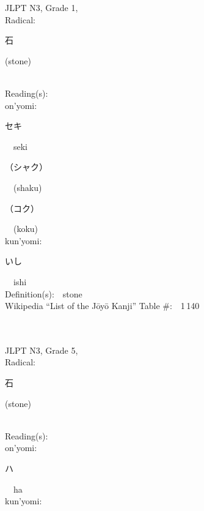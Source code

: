 \begin{multicols}{2}
{JLPT N3, Grade 1, \\Radical:\ \ {\begin{CJK}{UTF8}{min} 石 \end{CJK}} (stone) } \\
Reading(s):\ \ \\
{\hspace*{1em}}on'yomi:\ \ \\
{\hspace*{2em}}{\begin{CJK}{UTF8}{min} セキ \end{CJK}}\ \ seki\ \ \\
{\hspace*{2em}}{\begin{CJK}{UTF8}{min} （シャク） \end{CJK}}\ \ (shaku)\ \ \\
{\hspace*{2em}}{\begin{CJK}{UTF8}{min} （コク） \end{CJK}}\ \ (koku)\ \ \\
{\hspace*{1em}}kun'yomi:\ \ \\
{\hspace*{2em}}{\begin{CJK}{UTF8}{min} いし \end{CJK}}\ \ ishi\ \ \\
Definition(s):\ \ stone \\
Wikipedia ``List of the J\=oy\=o Kanji'' Table \#:\ \ 1\,140 \\
\ \ \\
{\fontsize{34pt}{40pt}  }\ \ \\  %
{JLPT N3, Grade 5, \\Radical:\ \ {\begin{CJK}{UTF8}{min} 石 \end{CJK}} (stone) } \\
Reading(s):\ \ \\
{\hspace*{1em}}on'yomi:\ \ \\
{\hspace*{2em}}{\begin{CJK}{UTF8}{min} ハ \end{CJK}}\ \ ha\ \ \\
{\hspace*{1em}}kun'yomi:\ \ \\

\end{multicols}
